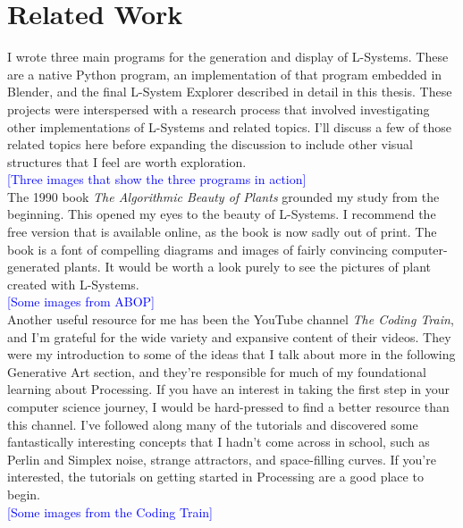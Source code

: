 \documentclass[12pt,twoside]{reedthesis}
\begin{document}
\section{Related Work}
	I wrote three main programs for the generation and display of L-Systems. These are a native Python program, an implementation of that program embedded in Blender, and the final L-System Explorer described in detail in this thesis. These projects were interspersed with a research process that involved investigating other implementations of L-Systems and related topics. I'll discuss a few of those related topics here before expanding the discussion to include other visual structures that I feel are worth exploration.\\
	
	\textcolor{blue}{[Three images that show the three programs in action]}\\

	The 1990 book \textit{The Algorithmic Beauty of Plants} grounded my study from the beginning. This opened my eyes to the beauty of L-Systems. I recommend the free version that is available online, as the book is now sadly out of print. The book is a font of compelling diagrams and images of fairly convincing computer-generated plants. It would be worth a look purely to see the pictures of plant created with L-Systems.\\
	
	\textcolor{blue}{[Some images from ABOP]}\\
	
	Another useful resource for me has been the YouTube channel \textit{The Coding Train}, and I'm grateful for the wide variety and expansive content of their videos. They were my introduction to some of the ideas that I talk about more in the following Generative Art section, and they're responsible for much of my foundational learning about Processing. If you have an interest in taking the first step in your computer science journey, I would be hard-pressed to find a better resource than this channel. I've followed along many of the tutorials and discovered some fantastically interesting concepts that I hadn't come across in school, such as Perlin and Simplex noise, strange attractors, and space-filling curves. If you're interested, the tutorials on getting started in Processing are a good place to begin.\\
	
	\textcolor{blue}{[Some images from the Coding Train]}\\
	
\end{document}
